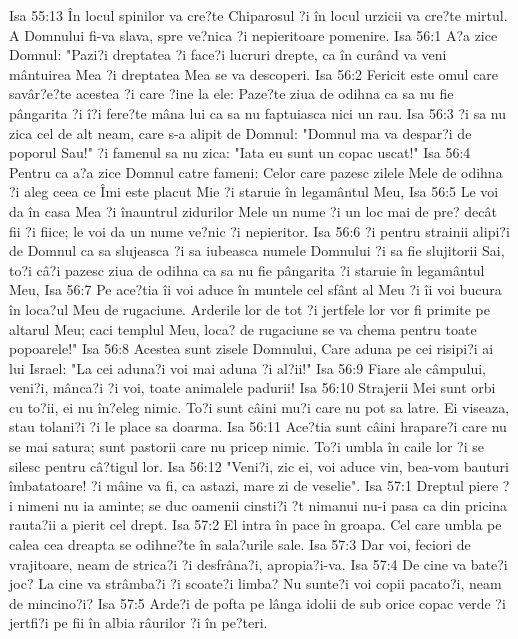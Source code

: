 Isa 55:13  În locul spinilor va cre?te Chiparosul ?i în locul urzicii va cre?te mirtul. A Domnului fi-va slava, spre ve?nica ?i nepieritoare pomenire.
Isa 56:1  A?a zice Domnul: "Pazi?i dreptatea ?i face?i lucruri drepte, ca în curând va veni mântuirea Mea ?i dreptatea Mea se va descoperi.
Isa 56:2  Fericit este omul care savâr?e?te acestea ?i care ?ine la ele: Paze?te ziua de odihna ca sa nu fie pângarita ?i î?i fere?te mâna lui ca sa nu faptuiasca nici un rau.
Isa 56:3  ?i sa nu zica cel de alt neam, care s-a alipit de Domnul: "Domnul ma va despar?i de poporul Sau!" ?i famenul sa nu zica: "Iata eu sunt un copac uscat!"
Isa 56:4  Pentru ca a?a zice Domnul catre fameni: Celor care pazesc zilele Mele de odihna ?i aleg ceea ce Îmi este placut Mie ?i staruie în legamântul Meu,
Isa 56:5  Le voi da în casa Mea ?i înauntrul zidurilor Mele un nume ?i un loc mai de pre? decât fii ?i fiice; le voi da un nume ve?nic ?i nepieritor.
Isa 56:6  ?i pentru strainii alipi?i de Domnul ca sa slujeasca ?i sa iubeasca numele Domnului ?i sa fie slujitorii Sai, to?i câ?i pazesc ziua de odihna ca sa nu fie pângarita ?i staruie în legamântul Meu,
Isa 56:7  Pe ace?tia îi voi aduce în muntele cel sfânt al Meu ?i îi voi bucura în loca?ul Meu de rugaciune. Arderile lor de tot ?i jertfele lor vor fi primite pe altarul Meu; caci templul Meu, loca? de rugaciune se va chema pentru toate popoarele!"
Isa 56:8  Acestea sunt zisele Domnului, Care aduna pe cei risipi?i ai lui Israel: "La cei aduna?i voi mai aduna ?i al?ii!"
Isa 56:9  Fiare ale câmpului, veni?i, mânca?i ?i voi, toate animalele padurii!
Isa 56:10  Strajerii Mei sunt orbi cu to?ii, ei nu în?eleg nimic. To?i sunt câini mu?i care nu pot sa latre. Ei viseaza, stau tolani?i ?i le place sa doarma.
Isa 56:11  Ace?tia sunt câini hrapare?i care nu se mai satura; sunt pastorii care nu pricep nimic. To?i umbla în caile lor ?i se silesc pentru câ?tigul lor.
Isa 56:12  "Veni?i, zic ei, voi aduce vin, bea-vom bauturi îmbatatoare! ?i mâine va fi, ca astazi, mare zi de veselie".
Isa 57:1  Dreptul piere ?i nimeni nu ia aminte; se duc oamenii cinsti?i ?t nimanui nu-i pasa ca din pricina rauta?ii a pierit cel drept.
Isa 57:2  El intra în pace în groapa. Cel care umbla pe calea cea dreapta se odihne?te în sala?urile sale.
Isa 57:3  Dar voi, feciori de vrajitoare, neam de strica?i ?i desfrâna?i, apropia?i-va.
Isa 57:4  De cine va bate?i joc? La cine va strâmba?i ?i scoate?i limba? Nu sunte?i voi copii pacato?i, neam de mincino?i?
Isa 57:5  Arde?i de pofta pe lânga idolii de sub orice copac verde ?i jertfi?i pe fii în albia râurilor ?i în pe?teri.
